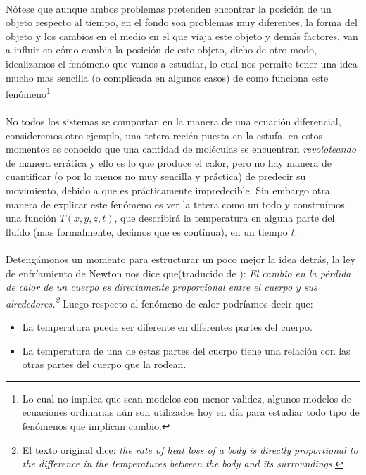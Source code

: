 \documentclass{article}
\begin{document}
\paragraph{}Nótese que aunque ambos problemas pretenden encontrar la posición de un objeto respecto al tiempo, en el fondo son problemas muy diferentes, la forma del objeto y los cambios en el medio en el que viaja este objeto y demás factores, van a influir en cómo cambia la posición de este objeto, dicho de otro modo, idealizamos el fenómeno que vamos a estudiar, lo cual nos permite tener una idea mucho mas sencilla (o complicada en algunos casos) de como funciona este fenómeno\footnote{Lo cual no implica que sean modelos con menor validez, algunos modelos de ecuaciones ordinarias aún son utilizados hoy en día para estudiar todo tipo de fenómenos que implican cambio.}
\paragraph{}No todos los sistemas se comportan en la manera de una ecuación diferencial, consideremos otro ejemplo, una tetera recién puesta en la estufa, en estos momentos es conocido que una cantidad de moléculas se encuentran \textit{revoloteando} de manera errática y ello es lo que produce el calor, pero no hay manera de cuantificar (o por lo menos no muy sencilla y práctica) de predecir su movimiento, debido a que es prácticamente impredecible. Sin embargo otra manera de explicar este fenómeno es ver la tetera como un todo y construímos una función $T(x,y,z,t)$, que describirá la temperatura en alguna parte del fluído (mas formalmente, decimos que es contínua), en un tiempo $t$.
\paragraph{} Detengámonos un momento para estructurar un poco mejor la idea detrás, la ley de enfríamiento de Newton nos dice que(traducido de \cite{raymondserway2013}): \textit{El cambio en la pérdida de calor de un cuerpo es directamente proporcional entre el cuerpo y sus alrededores.\footnote{El texto original dice: \textit{the rate of heat loss of a body is directly proportional to the difference in the temperatures between the body and its surroundings.}}} Luego respecto al fenómeno de calor podríamos decir que:
\begin{itemize}
    \item La temperatura puede ser diferente en diferentes partes del cuerpo.
    \item La temperatura de una de estas partes del cuerpo tiene una relación con las otras partes del cuerpo que la rodean.
\end{itemize}
\end{document}
